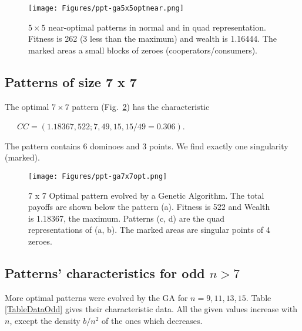 \documentclass[10pt,a4paper]{article}  %
\begin{document}
\begin{figure}[H] 
\centering

\texttt{[image: Figures/ppt-ga5x5optnear.png]}
\caption{
 $5 \times 5$ near-optimal patterns in normal and in quad representation.
Fitness is 262 (3 less than the maximum) and wealth is  1.16444.
The marked areas a small blocks of zeroes (cooperators/consumers).
}
\label{ppt-ga5x5optnear}
\end{figure}


\subsection{Patterns of size 7 x 7}


The optimal $7 \times 7$ pattern (Fig.~\ref{ppt-ga7x7opt})
has the characteristic%

~~~$CC=(1.18367, 522; 7, 49, 15, 15/49=0.306)$.%

The pattern contains 6 dominoes and 3 points. 
We find exactly one singularity (marked). %

 
\begin{figure}[H] 
\centering

\texttt{[image: Figures/ppt-ga7x7opt.png]}
\caption{
7 x 7 Optimal pattern evolved by a Genetic Algorithm.
The total payoffs are shown below the pattern (a). 
Fitness is 522 and Wealth is 1.18367, the maximum.
Patterns (c, d) are the quad representations of (a, b).
The marked areas are singular points of 4 zeroes. 
}
\label{ppt-ga7x7opt}
\end{figure}

\subsection{Patterns' characteristics for odd $n>7$}

More optimal patterns were evolved by the GA for $n=9,11,13,15$.
Table \ref{TableDataOdd} gives their characteristic data.
All the given values increase with $n$, except the density $b/n^2$ of the ones which decreases. 
\end{document}
